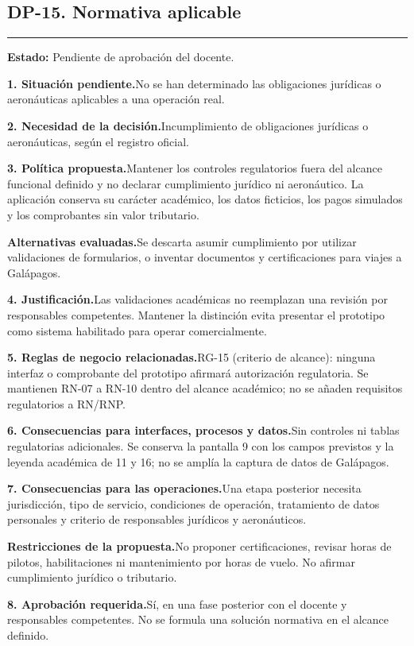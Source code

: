 \documentclass[11pt,a4paper]{article}
\newcommand{\fichacampo}[2]{\noindent\textbf{\color{azulvip}#1}\enspace #2\par\vspace{3pt}}
\begin{document}
\subsection{DP-15. Normativa aplicable}
{\color{doradovip}\rule{\textwidth}{.5pt}}
\textbf{Estado:} Pendiente de aprobación del docente.\par\vspace{4pt}
{\normalsize
\fichacampo{1. Situación pendiente.}{No se han determinado las obligaciones jurídicas o aeronáuticas aplicables a una operación real.}
\fichacampo{2. Necesidad de la decisión.}{Incumplimiento de obligaciones jurídicas o aeronáuticas, según el registro oficial.}
\fichacampo{3. Política propuesta.}{Mantener los controles regulatorios fuera del alcance funcional definido y no declarar cumplimiento jurídico ni aeronáutico. La aplicación conserva su carácter académico, los datos ficticios, los pagos simulados y los comprobantes sin valor tributario.}
\fichacampo{Alternativas evaluadas.}{Se descarta asumir cumplimiento por utilizar validaciones de formularios, o inventar documentos y certificaciones para viajes a Galápagos.}
\fichacampo{4. Justificación.}{Las validaciones académicas no reemplazan una revisión por responsables competentes. Mantener la distinción evita presentar el prototipo como sistema habilitado para operar comercialmente.}
\fichacampo{5. Reglas de negocio relacionadas.}{RG-15 (criterio de alcance): ninguna interfaz o comprobante del prototipo afirmará autorización regulatoria. Se mantienen RN-07 a RN-10 dentro del alcance académico; no se añaden requisitos regulatorios a RN/RNP.}
\fichacampo{6. Consecuencias para interfaces, procesos y datos.}{Sin controles ni tablas regulatorias adicionales. Se conserva la pantalla 9 con los campos previstos y la leyenda académica de 11 y 16; no se amplía la captura de datos de Galápagos.}
\fichacampo{7. Consecuencias para las operaciones.}{Una etapa posterior necesita jurisdicción, tipo de servicio, condiciones de operación, tratamiento de datos personales y criterio de responsables jurídicos y aeronáuticos.}
\fichacampo{Restricciones de la propuesta.}{No proponer certificaciones, revisar horas de pilotos, habilitaciones ni mantenimiento por horas de vuelo. No afirmar cumplimiento jurídico o tributario.}
\fichacampo{8. Aprobación requerida.}{Sí, en una fase posterior con el docente y responsables competentes. No se formula una solución normativa en el alcance definido.}
}
\clearpage
\end{document}
